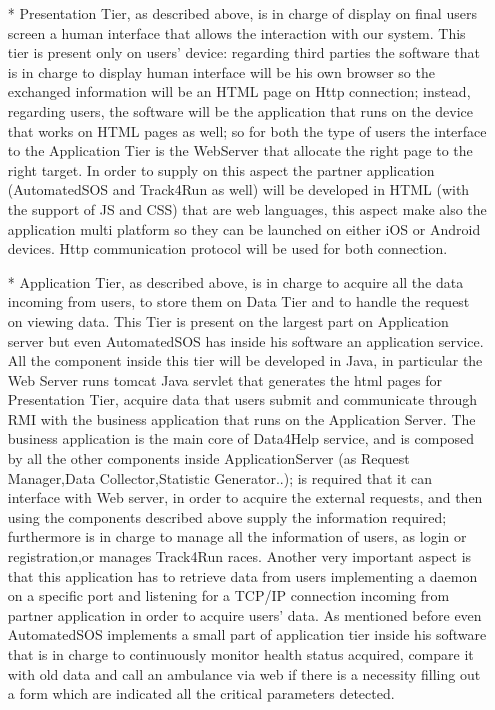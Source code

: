\begin{enumerate}
\begin{enumerate}
		\begin{enumerate}
		\item[*] Presentation Tier, as described above, is in charge of display on final users screen a human interface that allows the interaction with our system. This tier is present only on users' device: regarding third parties the software that is in charge to display human interface will be his own browser so the exchanged information will be an HTML page on Http connection; instead, regarding users, the software will be the application that runs on the device that works on HTML pages as well; so for both the type of users the interface to the Application Tier is the WebServer that allocate the right page to the right target. In order to supply on this aspect the partner application (AutomatedSOS and Track4Run as well) will be developed in HTML (with the support of JS and CSS) that are web languages, this aspect make also the application multi platform so they can be launched on either iOS or Android devices. Http communication protocol will be used for both connection.
		\item[*] Application Tier, as described above, is in charge to acquire all the data incoming from users, to store them on Data Tier and to handle the request on viewing data. This Tier is present on the largest part on Application server but even AutomatedSOS has inside his software an application service. All the component inside this tier will be developed in Java, in particular the Web Server runs tomcat Java servlet that generates the html pages for Presentation Tier, acquire data that users submit and communicate through RMI with the business application that runs on the Application Server. The business application is the main core of Data4Help service, and is composed by all the other components inside ApplicationServer (as Request Manager,Data Collector,Statistic Generator..); is required that it can interface with Web server, in order to acquire the external requests, and then using the components described above supply the information required; furthermore is in charge to manage all the information of users, as login or registration,or manages Track4Run races. Another very important aspect is that this application has to  retrieve data from users implementing a daemon on a specific port and listening for a TCP/IP connection incoming from partner application in order to acquire users' data. As mentioned before even AutomatedSOS implements a small part of application tier inside his software that is in charge to continuously monitor health status acquired, compare it with old data and call an ambulance via web if there is a necessity filling out a form which are indicated all the critical parameters detected.
		

\end{enumerate}
\end{enumerate}
\end{enumerate}
